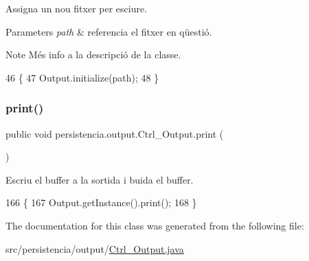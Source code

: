 Assigna un nou fitxer per esciure. 


\begin{DoxyParams}{Parameters}
{\em path} & referencia el fitxer en qüestió. \\
\hline
\end{DoxyParams}
\begin{DoxyNote}{Note}
Més info a la descripció de la classe. 
\end{DoxyNote}

\begin{DoxyCode}
46                                                \{
47         Output.initialize(path);
48     \}
\end{DoxyCode}
\mbox{\label{classpersistencia_1_1output_1_1Ctrl__Output_a908955c29bfecc7ebac86613bc75e9ed}} 
\subsubsection{\texorpdfstring{print()}{print()}}
{\footnotesize\ttfamily public void persistencia.\+output.\+Ctrl\+\_\+\+Output.\+print (\begin{DoxyParamCaption}{ }\end{DoxyParamCaption})\hspace{0.3cm}{\ttfamily [inline]}}



Escriu el buffer a la sortida i buida el buffer. 


\begin{DoxyCode}
166                         \{   
167         Output.getInstance().print();
168     \}
\end{DoxyCode}


The documentation for this class was generated from the following file\+:\begin{DoxyCompactItemize}
\item 
src/persistencia/output/\hyperlink{Ctrl__Output_8java}{Ctrl\+\_\+\+Output.\+java}\end{DoxyCompactItemize}
